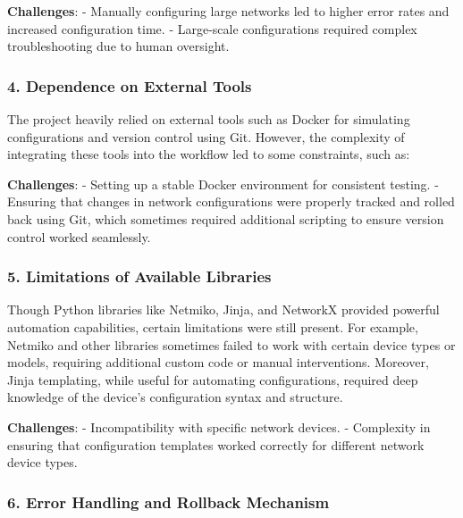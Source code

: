 \documentclass[11pt]{article}
\begin{document}
\textbf{Challenges}: - Manually configuring large networks led to higher
error rates and increased configuration time. - Large-scale
configurations required complex troubleshooting due to human oversight.

\hypertarget{dependence-on-external-tools}{%
\subsubsection{\texorpdfstring{4. \textbf{Dependence on External
Tools}}{4. Dependence on External Tools}}\label{dependence-on-external-tools}}

The project heavily relied on external tools such as Docker for
simulating configurations and version control using Git. However, the
complexity of integrating these tools into the workflow led to some
constraints, such as:

\textbf{Challenges}: - Setting up a stable Docker environment for
consistent testing. - Ensuring that changes in network configurations
were properly tracked and rolled back using Git, which sometimes
required additional scripting to ensure version control worked
seamlessly.

\hypertarget{limitations-of-available-libraries}{%
\subsubsection{\texorpdfstring{5. \textbf{Limitations of Available
Libraries}}{5. Limitations of Available Libraries}}\label{limitations-of-available-libraries}}

Though Python libraries like Netmiko, Jinja, and NetworkX provided
powerful automation capabilities, certain limitations were still
present. For example, Netmiko and other libraries sometimes failed to
work with certain device types or models, requiring additional custom
code or manual interventions. Moreover, Jinja templating, while useful
for automating configurations, required deep knowledge of the device's
configuration syntax and structure.

\textbf{Challenges}: - Incompatibility with specific network devices. -
Complexity in ensuring that configuration templates worked correctly for
different network device types.

\hypertarget{error-handling-and-rollback-mechanism}{%
\subsubsection{\texorpdfstring{6. \textbf{Error Handling and Rollback
Mechanism}}{6. Error Handling and Rollback Mechanism}}\label{error-handling-and-rollback-mechanism}}
\end{document}
